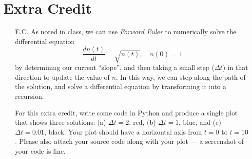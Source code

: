 \documentclass[11pt,onecolumn,superscriptaddress,notitlepage]{article}
\begin{document}
\clearpage
\section*{Extra Credit}
\begin{enumerate}[resume]
\item[E.C.] As noted in class, we can use {\it Forward Euler} to numerically solve the differential equation$$\frac{dn(t)}{dt}=\sqrt{n(t)},\quad n(0)=1$$
by determining our current ``slope'', and then taking a small step ($\Delta t$) in that direction to update the value of $n$. In this way, we can step along the path of the solution, and solve a differential equation by transforming it into a recursion. 

For this extra credit, write some code in Python and produce a single plot that shows three solutions: (a) $\Delta t = 2$, red, (b) $\Delta t = 1$, blue, and (c) $\Delta t = 0.01$, black.  Your plot should have a horizontal axis from $t=0$ to $t=10$. Please also attach your source code along with your plot --- a screenshot of your code is fine. 
\end{enumerate}


\end{document}
